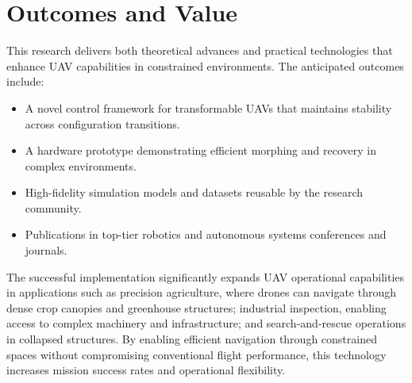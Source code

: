 \documentclass[11pt,a4paper]{article}
\begin{document}
\section{Outcomes and Value}
This research delivers both theoretical advances and practical technologies that enhance UAV capabilities in constrained environments. The anticipated outcomes include:
\begin{itemize}
    \item A novel control framework for transformable UAVs that maintains stability across configuration transitions.
    \item A hardware prototype demonstrating efficient morphing and recovery in complex environments.
    \item High-fidelity simulation models and datasets reusable by the research community.
    \item Publications in top-tier robotics and autonomous systems conferences and journals.
\end{itemize}
\noindent
The successful implementation significantly expands UAV operational capabilities in applications such as precision agriculture, where drones can navigate through dense crop canopies and greenhouse structures; industrial inspection, enabling access to complex machinery and infrastructure; and search-and-rescue operations in collapsed structures. By enabling efficient navigation through constrained spaces without compromising conventional flight performance, this technology increases mission success rates and operational flexibility.



\end{document}
